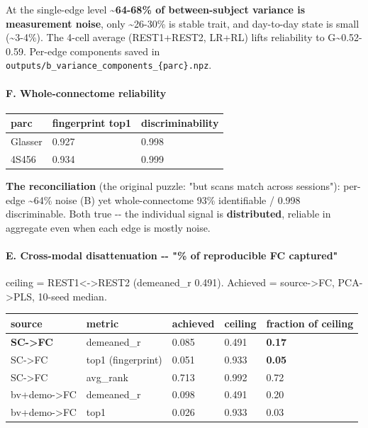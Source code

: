 At the single-edge level \textbf{\textasciitilde64-68\% of between-subject variance is measurement noise}, only \textasciitilde26-30\% is stable trait, and day-to-day state is small (\textasciitilde3-4\%). The 4-cell average (REST1+REST2, LR+RL) lifts reliability to G\textasciitilde0.52-0.59. Per-edge components saved in \texttt{outputs/b\_variance\_components\_\{parc\}.npz}.

\paragraph{F. Whole-connectome reliability}\label{f-whole-connectome-reliability}

{\def\LTcaptype{none} %
\begin{longtable}[]{@{}lll@{}}
\toprule\noalign{}
parc & fingerprint top1 & discriminability \\
\midrule\noalign{}
\endhead
\bottomrule\noalign{}
\endlastfoot
Glasser & 0.927 & 0.998 \\
4S456 & 0.934 & 0.999 \\
\end{longtable}
}

\textbf{The reconciliation} (the original puzzle: "but scans match across sessions"): per-edge \textasciitilde64\% noise (B) yet whole-connectome 93\% identifiable / 0.998 discriminable. Both true -\/- the individual signal is \textbf{distributed}, reliable in aggregate even when each edge is mostly noise.

\paragraph{E. Cross-modal disattenuation -\/- "\% of reproducible FC captured"}\label{e-cross-modal-disattenuation-----of-reproducible-fc-captured}

ceiling = REST1\textless-\textgreater REST2 (demeaned\_r 0.491). Achieved = source-\textgreater FC, PCA-\textgreater PLS, 10-seed median.

{\def\LTcaptype{none} %
\begin{longtable}[]{@{}lllll@{}}
\toprule\noalign{}
source & metric & achieved & ceiling & fraction of ceiling \\
\midrule\noalign{}
\endhead
\bottomrule\noalign{}
\endlastfoot
\textbf{SC-\textgreater FC} & demeaned\_r & 0.085 & 0.491 & \textbf{0.17} \\
SC-\textgreater FC & top1 (fingerprint) & 0.051 & 0.933 & \textbf{0.05} \\
SC-\textgreater FC & avg\_rank & 0.713 & 0.992 & 0.72 \\
bv+demo-\textgreater FC & demeaned\_r & 0.098 & 0.491 & 0.20 \\
bv+demo-\textgreater FC & top1 & 0.026 & 0.933 & 0.03 \\
\end{longtable}
}

